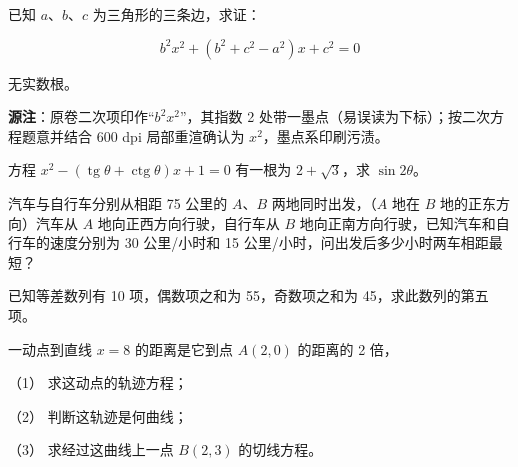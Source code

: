 \begin{question}
已知 $a$、$b$、$c$ 为三角形的三条边，求证：

\nopagebreak[4]
\[
b^2x^2+(b^2+c^2-a^2)x+c^2=0
\]

无实数根。

\begin{gktip}
\textbf{源注}：原卷二次项印作“$b^2x^2$”，其指数 2 处带一墨点（易误读为下标）；按二次方程题意并结合 600 dpi 局部重渲确认为 $x^2$，墨点系印刷污渍。
\end{gktip}

\end{question}
\begin{question}
方程 $x^2-(\operatorname{tg}\theta+\operatorname{ctg}\theta)x+1=0$ 有一根为 $2+\sqrt3$，求 $\sin2\theta$。

\end{question}
\begin{question}
汽车与自行车分别从相距 75 公里的 $A$、$B$ 两地同时出发，（$A$ 地在 $B$ 地的正东方向）汽车从 $A$ 地向正西方向行驶，自行车从 $B$ 地向正南方向行驶，已知汽车和自行车的速度分别为 30 公里/小时和 15 公里/小时，问出发后多少小时两车相距最短？

\end{question}
\begin{question}
已知等差数列有 10 项，偶数项之和为 55，奇数项之和为 45，求此数列的第五项。

\end{question}
\begin{question}
一动点到直线 $x=8$ 的距离是它到点 $A(2,0)$ 的距离的 2 倍，

（1） 求这动点的轨迹方程；

（2） 判断这轨迹是何曲线；

（3） 求经过这曲线上一点 $B(2,3)$ 的切线方程。

\end{question}